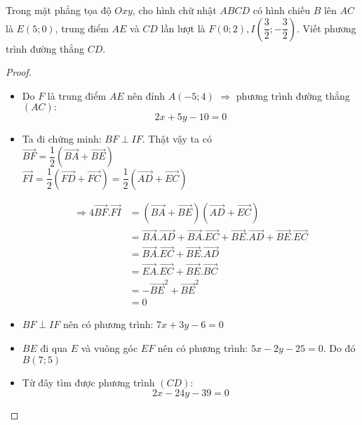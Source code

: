 \begin{dl}
	Trong mặt phẳng tọa độ $Oxy$, cho hình chữ nhật $ABCD$ có hình chiếu $B$ lên $AC$ là $E(5;0)$, trung điểm $AE$ và $CD$ lần lượt là $F(0;2), I\left(\dfrac{3}{2};-\dfrac{3}{2}\right)$. Viết phương trình đường thẳng $CD$.
\end{dl}
\begin{proof}~
	\begin{center}
		
	\end{center}

	\begin{itemize}
		\item Do $F$ là trung điểm $AE$ nên đỉnh $A(-5;4)$
	$\Rightarrow$ phương trình đường thẳng $(AC):$ $$2x+5y-10=0$$
	
		\item Ta đi chứng minh: $BF\perp IF$. Thật vậy ta có\\[6pt]
		$\overrightarrow{BF}=\dfrac{1}{2}\left(\overrightarrow{BA}+ \overrightarrow{BE}\right)$\\[8pt]
		$\overrightarrow{FI}=\dfrac{1}{2}\left(\overrightarrow{FD}+\overrightarrow{FC}\right)=\dfrac{1}{2}\left(\overrightarrow{AD}+\overrightarrow{EC}\right)$
		
		\begin{align*}
			\Rightarrow 4\overrightarrow{BF}.\overrightarrow{FI}
				&=\left(\overrightarrow{BA}+ \overrightarrow{BE}\right)\left(\overrightarrow{AD}+\overrightarrow{EC}\right)\\
				&=\overrightarrow{BA}.\overrightarrow{AD}+ \overrightarrow{BA}.\overrightarrow{EC}+ \overrightarrow{BE}.\overrightarrow{AD}+\overrightarrow{BE}.\overrightarrow{EC}\\
				&=\overrightarrow{BA}.\overrightarrow{EC}+ \overrightarrow{BE}.\overrightarrow{AD}\\
				&=\overrightarrow{EA}.\overrightarrow{EC}+ \overrightarrow{BE}.\overrightarrow{BC}\\
				&=-\overrightarrow{BE}^2+\overrightarrow{BE}^2\\
				&=0
		\end{align*}
		\item $BF\perp IF$ nên có phương trình: $7x+3y-6=0$
		\item $BE$ đi qua $E$ và vuông góc $EF$ nên có phương trình: $5x-2y-25=0$.
		Do đó $B(7;5)$	
		\item Từ đây tìm được phương trình $(CD):$ $$2x-24y-39=0$$
	\end{itemize}
\end{proof}
